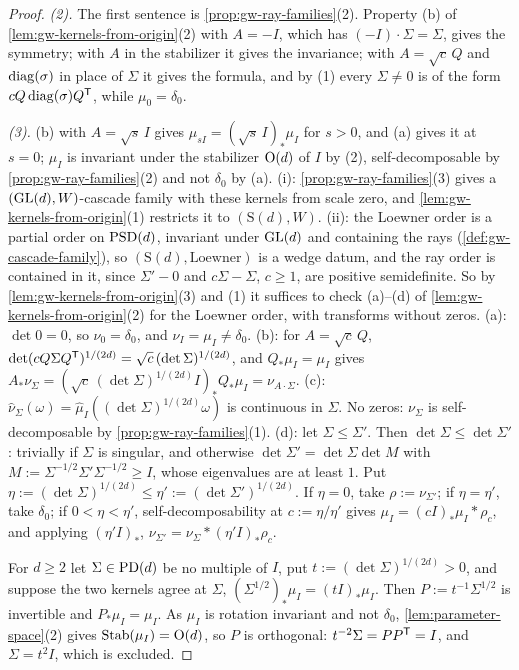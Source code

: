 \begin{proof}
\emph{(2).} The first sentence is \ref{prop:gw-ray-families}(2). Property (b) of
\ref{lem:gw-kernels-from-origin}(2) with $A = -I$, which has $(-I)\cdot\Sigma = \Sigma$, gives the
symmetry; with $A$ in the stabilizer it gives the invariance; with $A = \sqrt c\,Q$ and $\operatorname{diag}(\sigma)$ in
place of $\Sigma$ it gives the formula, and by (1) every $\Sigma \ne 0$ is of the form
$cQ\operatorname{diag}(\sigma)Q^{\mathsf{T}}$, while $\mu_0 = \delta_0$.

\emph{(3).} (b) with $A = \sqrt s\,I$ gives $\mu_{sI} = (\sqrt s\,I)_*\mu_I$ for $s > 0$, and (a) gives it at
$s = 0$; $\mu_I$ is invariant under the stabilizer $\mathrm{O}(d)$ of $I$ by (2), self-decomposable by
\ref{prop:gw-ray-families}(2) and not $\delta_0$ by (a). (i): \ref{prop:gw-ray-families}(3) gives a
$(\mathrm{GL}(d), W)$-cascade family with these kernels from scale zero, and \ref{lem:gw-kernels-from-origin}(1)
restricts it to $(\mathrm S(d), W)$. (ii): the Loewner order is a partial order on $\mathrm{PSD}(d)$, invariant under
$\mathrm{GL}(d)$ and containing the rays (\ref{def:gw-cascade-family}), so $(\mathrm S(d), \text{Loewner})$ is a
wedge datum, and the ray order is contained in it, since $\Sigma' - 0$ and $c\Sigma - \Sigma$, $c \ge 1$,
are positive semidefinite. So by \ref{lem:gw-kernels-from-origin}(3) and (1) it suffices to check (a)--(d)
of \ref{lem:gw-kernels-from-origin}(2) for the Loewner order, with transforms without zeros. (a):
$\det 0 = 0$, so $\nu_0 = \delta_0$, and $\nu_I = \mu_I \ne \delta_0$. (b): for $A = \sqrt c\,Q$,
$\det(cQ\Sigma Q^{\mathsf{T}})^{1/(2d)} = \sqrt c\,(\det\Sigma)^{1/(2d)}$, and $Q_*\mu_I = \mu_I$ gives
$A_*\nu_\Sigma = (\sqrt c\,(\det\Sigma)^{1/(2d)}I)_*Q_*\mu_I = \nu_{A\cdot\Sigma}$. (c):
$\widehat\nu_\Sigma(\omega) = \widehat\mu_I((\det\Sigma)^{1/(2d)}\omega)$ is continuous in $\Sigma$. No
zeros: $\nu_\Sigma$ is self-decomposable by \ref{prop:gw-ray-families}(1). (d): let $\Sigma \le \Sigma'$.
Then $\det\Sigma \le \det\Sigma'$: trivially if $\Sigma$ is singular, and otherwise
$\det\Sigma' = \det\Sigma\det M$ with $M := \Sigma^{-1/2}\Sigma'\Sigma^{-1/2} \ge I$, whose eigenvalues are
at least $1$. Put $\eta := (\det\Sigma)^{1/(2d)} \le \eta' := (\det\Sigma')^{1/(2d)}$. If
$\eta = 0$, take $\rho := \nu_{\Sigma'}$; if $\eta = \eta'$, take $\delta_0$; if
$0 < \eta < \eta'$, self-decomposability at $c := \eta/\eta'$ gives
$\mu_I = (cI)_*\mu_I * \rho_c$, and applying $(\eta'I)_*$, $\nu_{\Sigma'} = \nu_\Sigma * (\eta'I)_*\rho_c$.

For $d \ge 2$ let $\Sigma \in \mathrm{PD}(d)$ be no multiple of $I$, put $t := (\det\Sigma)^{1/(2d)} > 0$, and
suppose the two kernels agree at $\Sigma$, $(\Sigma^{1/2})_*\mu_I = (tI)_*\mu_I$. Then
$P := t^{-1}\Sigma^{1/2}$ is invertible and $P_*\mu_I = \mu_I$. As $\mu_I$ is rotation invariant and not
$\delta_0$, \ref{lem:parameter-space}(2) gives $\operatorname{Stab}(\mu_I) = \mathrm{O}(d)$, so $P$ is orthogonal:
$t^{-2}\Sigma = PP^{\mathsf{T}} = I$, and $\Sigma = t^2I$, which is excluded.


\end{proof}
